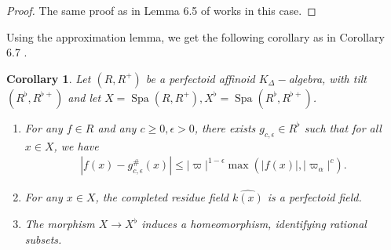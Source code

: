 \documentclass[12pts,a4paper]{amsart}
\newtheorem{corollary}[proposition]{Corollary}
\DeclareMathOperator{\spa}{Spa}
\begin{document}
\begin{proof}
   The same proof as in Lemma 6.5 of \cite{Sch} works in this case.
\end{proof}

Using the approximation lemma, we get the following corollary as in Corollary 6.7 \cite{Sch}.

\begin{corollary}
    Let $(R,R^+)$ be a perfectoid affinoid $K_\Delta-$algebra, with tilt $(R^\flat,R^{\flat+})$ and let $X=\spa(R,R^+), X^\flat=\spa(R^\flat,R^{\flat+})$.
    \begin{enumerate}
        \item[(i).] For any $f\in R$ and any $c\geq 0,\epsilon>0$, there exists $g_{c,\epsilon}\in R^{\flat}$ such that for all $x\in X$, we have
        \begin{align*}
            |f(x)-g^\#_{c,\epsilon}(x)|\leq |\varpi|^{1-\epsilon}\max(|f(x)|,|\varpi_\alpha|^c).
        \end{align*}
        \item[(ii).] For any $x\in X$, the completed residue field $\widehat{k(x)}$ is a perfectoid field.
        \item[(iii).] The morphism $X\to X^\flat$ induces a homeomorphism, identifying rational subsets.
    \end{enumerate}
\end{corollary}
\end{document}
